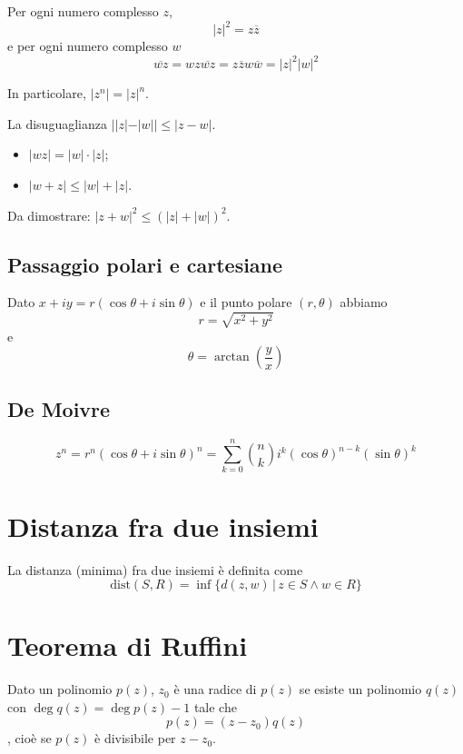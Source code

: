 \documentclass[a4paper]{article}
\begin{document}
Per ogni numero complesso \(z\),
\[
    {|z|}^2 = z\overline{z}
\]
e per ogni numero complesso \(w\)
\[
    \overline{wz} = wz\overline{wz} = z\overline{z}w\overline{w} = |z|^2|w|^2
\]

In particolare, \(|z^n| = |z|^n\).

La disuguaglianza \(||z| - |w|| \leq |z-w|\).

\begin{itemize}
    \item \(|wz| = |w|\cdot|z|\);
    \item \(|w+z| \leq |w| + |z|\).
\end{itemize}


Da dimostrare: \(|z+w|^2 \leq {(|z| + |w|)}^2\).

\subsection{Passaggio polari e cartesiane}

Dato \(x+iy = r(\cos\theta + i\sin\theta)\) e il punto polare \((r, \theta)\)
abbiamo
\[
    r = \sqrt{x^2 + y^2}
\]
e \[
    \theta = \arctan\left(\frac{y}{x}\right)
\]

\subsection{De Moivre}

\[
    z^n = r^n {(\cos \theta + i\sin\theta)}^n = \sum_{k=0}^n \binom{n}{k}
    i^k {(\cos\theta)}^{n-k}{(\sin\theta)}^k
\]

\section{Distanza fra due insiemi}

La distanza (minima) fra due insiemi è definita come
\[
    \text{dist}(S, R) = \inf \{ d(z,w) \,|\, z \in S \land w \in R \}
\]

\section{Teorema di Ruffini}

Dato un polinomio \(p(z)\), \(z_0\) è una radice di \(p(z)\) se esiste
un polinomio \(q(z)\) con \(\deg q(z) = \deg p(z) - 1\)
tale che \[p(z) = (z-z_0)q(z)\], cioè se \(p(z)\) è divisibile per \(z-z_0\).
\end{document}
